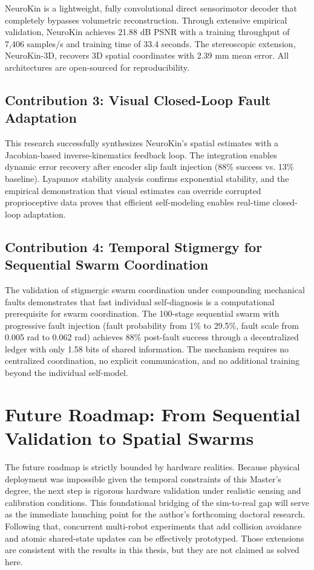 \documentclass[12pt,a4paper,oneside]{report}
\begin{document}
NeuroKin is a lightweight, fully convolutional direct sensorimotor decoder that completely bypasses volumetric reconstruction. Through extensive empirical validation, NeuroKin achieves 21.88 dB PSNR with a training throughput of 7,406 samples/s and training time of 33.4 seconds. The stereoscopic extension, NeuroKin-3D, recovers 3D spatial coordinates with 2.39 mm mean error. All architectures are open-sourced for reproducibility.

\subsection{Contribution 3: Visual Closed-Loop Fault Adaptation}

This research successfully synthesizes NeuroKin's spatial estimates with a Jacobian-based inverse-kinematics feedback loop. The integration enables dynamic error recovery after encoder slip fault injection (88\% success vs. 13\% baseline). Lyapunov stability analysis confirms exponential stability, and the empirical demonstration that visual estimates can override corrupted proprioceptive data proves that efficient self-modeling enables real-time closed-loop adaptation.

\subsection{Contribution 4: Temporal Stigmergy for Sequential Swarm Coordination}

The validation of stigmergic swarm coordination under compounding mechanical faults demonstrates that fast individual self-diagnosis is a computational prerequisite for swarm coordination. The 100-stage sequential swarm with progressive fault injection (fault probability from 1\% to 29.5\%, fault scale from 0.005 rad to 0.062 rad) achieves 88\% post-fault success through a decentralized ledger with only 1.58 bits of shared information. The mechanism requires no centralized coordination, no explicit communication, and no additional training beyond the individual self-model.

\section{Future Roadmap: From Sequential Validation to Spatial Swarms}

The future roadmap is strictly bounded by hardware realities. Because physical deployment was impossible given the temporal constraints of this Master's degree, the next step is rigorous hardware validation under realistic sensing and calibration conditions. This foundational bridging of the sim-to-real gap will serve as the immediate launching point for the author's forthcoming doctoral research. Following that, concurrent multi-robot experiments that add collision avoidance and atomic shared-state updates can be effectively prototyped. Those extensions are consistent with the results in this thesis, but they are not claimed as solved here.
\end{document}
